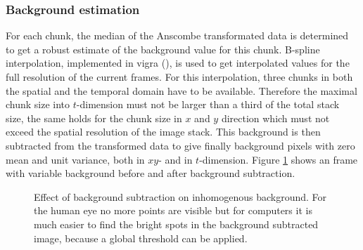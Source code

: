 \subsubsection{Background estimation}
For each chunk, the median of the Anscombe transformated data is determined to get a robust estimate of the background value for this chunk. 
B-spline interpolation, implemented in vigra (\cite{vigra}), is used to get interpolated values for the full resolution of the current frames. For this interpolation, three chunks in both the spatial and the temporal domain have to be available. Therefore the maximal chunk size into $t$-dimension must not be larger than a third of the total stack size, the same holds for the chunk size in $x$ and $y$ direction which must not exceed the spatial resolution of the image stack.\newline
This background is then subtracted from the transformed data to give finally background pixels with zero mean and unit variance, both in $xy$- and in $t$-dimension. Figure \ref{removedBG} shows an frame with variable background before and after background subtraction.
\begin{figure}
\hfill
{}
	\caption{Effect of background subtraction on inhomogenous background. For the human eye no more points are visible but for computers it is much easier to find the bright spots in the background subtracted image, because a global threshold can be applied.}
	\label{removedBG}	
\end{figure}
